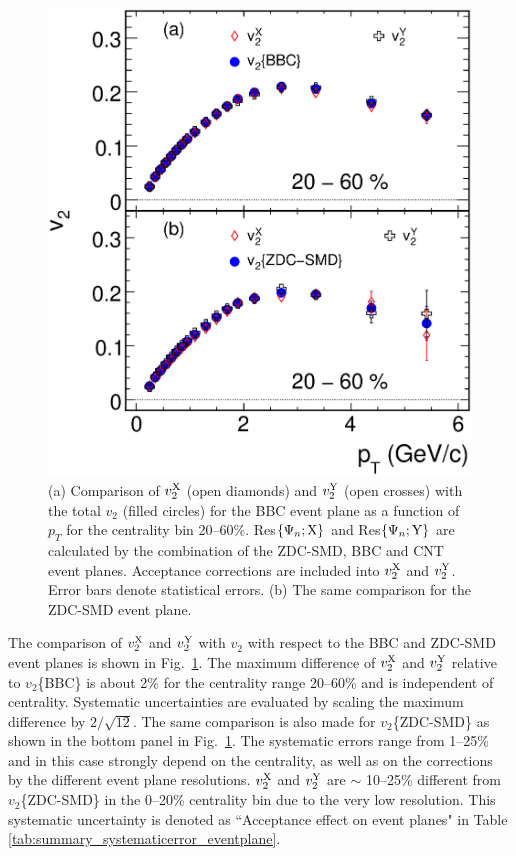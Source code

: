 \documentclass[aps,prc,superscriptaddress,showpacs,floatfix,twocolumn]{revtex4}
\newcommand \pt{\mbox{$p_T$}\xspace}
\newcommand \Fig{Fig.\xspace}
\begin{document}
\begin{figure}[thb]
\includegraphics[width=1.0\linewidth]{comparison_v2xy_and_v2_cent20-60_bbc_and_zdc-smd.eps}
\caption{\label{fig:comparison_v2xy_and_v2_cent20-60_bbc_and_zdc-smd}
(a) Comparison of $v_2^{\rm X}$ (open diamonds) and $v_2^{\rm Y}$ (open 
crosses) with the total $v_2$ (filled circles) for the BBC event plane as a 
function of \pt for the centrality bin 20--60\%. Res$\{\Psi_n;{\rm X}\}$ 
and Res$\{\Psi_n;{\rm Y}\}$ are calculated by the combination of the 
ZDC-SMD, BBC and CNT event planes. Acceptance corrections are included into 
$v_2^{\rm X}$ and $v_2^{\rm Y}$. Error bars denote statistical errors.
(b) The same comparison for the ZDC-SMD event plane.
}
\end{figure}

The comparison of $v_2^{\rm X}$ and $v_2^{\rm Y}$ with $v_2$ 
with respect to the BBC and ZDC-SMD event planes is shown in 
Fig.~\ref{fig:comparison_v2xy_and_v2_cent20-60_bbc_and_zdc-smd}. 
The maximum difference of $v_2^{\rm X}$ and $v_2^{\rm Y}$ 
relative to $v_2$\{BBC\} is about 2\% for the centrality range 
20--60\% and is independent of centrality. Systematic 
uncertainties are evaluated by scaling the maximum difference by 
$2/\sqrt{12}$. The same comparison is also made for 
$v_2$\{ZDC-SMD\} as shown in the bottom panel in 
\Fig~\ref{fig:comparison_v2xy_and_v2_cent20-60_bbc_and_zdc-smd}. 
The systematic errors range from 1--25\% and in this case 
strongly depend on the centrality, as well as on the corrections 
by the different event plane resolutions. $v_2^{\rm X}$ and 
$v_2^{\rm Y}$ are $\sim$ 10--25\% different from $v_2$\{ZDC-SMD\} 
in the 0--20\% centrality bin due to the very low resolution. 
This systematic uncertainty is denoted as ``Acceptance effect on 
event planes" in Table 
\ref{tab:summary_systematicerror_eventplane}.
\end{document}
